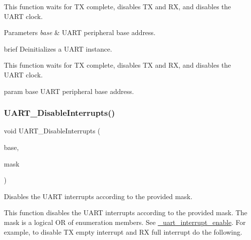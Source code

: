 This function waits for TX complete, disables TX and RX, and disables the U\+A\+RT clock.


\begin{DoxyParams}{Parameters}
{\em base} & U\+A\+RT peripheral base address.\\
\hline
\end{DoxyParams}
brief Deinitializes a U\+A\+RT instance.

This function waits for TX complete, disables TX and RX, and disables the U\+A\+RT clock.

param base U\+A\+RT peripheral base address. \mbox{\label{group__uart__driver_ga3f24b6b9b730046a9a81918f9abe7d99}} 
\subsubsection{\texorpdfstring{UART\_DisableInterrupts()}{UART\_DisableInterrupts()}}
{\footnotesize\ttfamily void U\+A\+R\+T\+\_\+\+Disable\+Interrupts (\begin{DoxyParamCaption}\item[{\mbox{\hyperlink{struct_u_a_r_t___type}{U\+A\+R\+T\+\_\+\+Type}} $\ast$}]{base,  }\item[{uint32\+\_\+t}]{mask }\end{DoxyParamCaption})}



Disables the U\+A\+RT interrupts according to the provided mask. 

This function disables the U\+A\+RT interrupts according to the provided mask. The mask is a logical OR of enumeration members. See \mbox{\hyperlink{group__uart__driver_ga700f3cd8e3800273a1591307cab6311c}{\+\_\+uart\+\_\+interrupt\+\_\+enable}}. For example, to disable TX empty interrupt and RX full interrupt do the following. 
\begin{DoxyCode}{0}
\end{DoxyCode}



